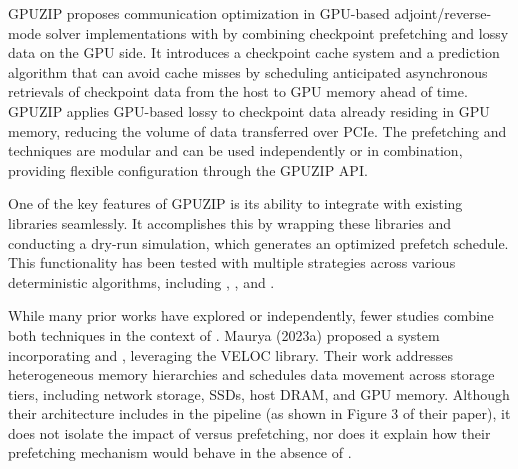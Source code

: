 \documentclass[Ingles,Final]{ic-tese-v3}
\begin{document}

GPUZIP proposes communication optimization in GPU-based adjoint/reverse-mode solver implementations with \checkpointing by combining checkpoint prefetching and lossy data \compression on the GPU side. It introduces a checkpoint cache system and a prediction algorithm that can avoid cache misses by scheduling anticipated asynchronous retrievals of checkpoint data from the host to GPU memory ahead of time. GPUZIP applies GPU-based lossy \compression to checkpoint data already residing in GPU memory, reducing the volume of data transferred over PCIe. The prefetching and \compression techniques are modular and can be used independently or in combination, providing flexible configuration through the GPUZIP API.

One of the key features of GPUZIP is its ability to integrate with existing \checkpointing libraries seamlessly. It accomplishes this by wrapping these libraries and conducting a dry-run simulation, which generates an optimized prefetch schedule. This functionality has been tested with multiple \checkpointing strategies across various deterministic algorithms, including \revolve, \zcut, and \uniform.

While many prior works have explored \prefetching or \compression independently, fewer studies combine both techniques in the context of \checkpointing. Maurya \etal (2023a)\cite{maurya2023} proposed a system incorporating \prefetching and \compression, leveraging the VELOC library. Their work addresses heterogeneous memory hierarchies and schedules data movement across storage tiers, including network storage, SSDs, host DRAM, and GPU memory. Although their architecture includes \compression in the pipeline (as shown in Figure 3 of their paper), it does not isolate the impact of \compression versus prefetching, nor does it explain how their prefetching mechanism would behave in the absence of \compression. 
\end{document}
